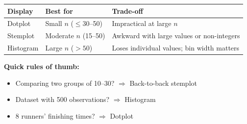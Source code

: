 \documentclass[aspectratio=169, 11pt]{beamer}
\begin{document}
{
\begin{frame}[t, plain]
  \hspace{0.55cm}%
  \begin{minipage}{0.9\textwidth}
    \vspace{0.3em}\small

    \begin{tabular}{p{} p{} p{}}
    \rowcolor{sky}
    \textbf{Display} & \textbf{Best for} & \textbf{Trade-off} \\
    \hline
    Dotplot & Small $n$ ($\le 30$--50) & Impractical at large $n$ \\[4pt]
    Stemplot & Moderate $n$ (15--50) & Awkward with large values or non-integers \\[4pt]
    Histogram & Large $n$ ($> 50$) & Loses individual values; bin width matters \\
    \end{tabular}

    \vspace{0.5cm}
    \textbf{\color{navy}Quick rules of thumb:}
    \begin{itemize}\setlength{\itemsep}{0.4em}
      \item Comparing two groups of 10--30? $\Rightarrow$ Back-to-back stemplot
      \item Dataset with 500 observations? $\Rightarrow$ Histogram
      \item 8 runners' finishing times? $\Rightarrow$ Dotplot
    \end{itemize}
  \end{minipage}
\end{frame}
}
\end{document}
